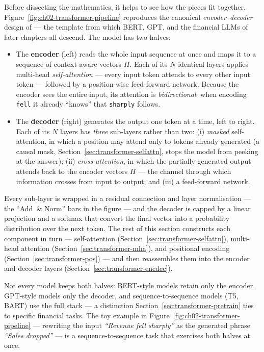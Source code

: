 \begin{deepdive}
Before dissecting the mathematics, it helps to see how the pieces fit together.
Figure~\ref{fig:ch02-transformer-pipeline} reproduces the canonical
\emph{encoder--decoder} design of \citet{vaswani2017attention} --- the template
from which BERT, GPT, and the financial LLMs of later chapters all descend.
The model has two halves:
\begin{itemize}
  \item The \textbf{encoder} (left) reads the whole input sequence at once and
        maps it to a sequence of context-aware vectors $H$.  Each of its $N$
        identical layers applies multi-head \emph{self-attention} --- every
        input token attends to every other input token --- followed by a
        position-wise feed-forward network.  Because the encoder sees the entire
        input, its attention is \emph{bidirectional}: when encoding
        \texttt{fell} it already ``knows'' that \texttt{sharply} follows.
  \item The \textbf{decoder} (right) generates the output one token at a time,
        left to right.  Each of its $N$ layers has \emph{three} sub-layers
        rather than two: (i) \emph{masked} self-attention, in which a position
        may attend only to tokens already generated (a causal mask,
        Section~\ref{sec:transformer-selfattn}, stops the model from peeking at
        the answer); (ii) \emph{cross-attention}, in which the partially
        generated output attends back to the encoder vectors $H$ --- the channel
        through which information crosses from input to output; and (iii) a
        feed-forward network.
\end{itemize}
Every sub-layer is wrapped in a residual connection and layer normalisation
--- the ``Add~\& Norm'' bars in the figure --- and the decoder is capped by a
linear projection and a softmax that convert the final vector into a probability
distribution over the next token.
The rest of this section constructs each component in turn --- self-attention
(Section~\ref{sec:transformer-selfattn}), multi-head attention
(Section~\ref{sec:transformer-mha}), and positional encoding
(Section~\ref{sec:transformer-pos}) --- and then reassembles them into the
encoder and decoder layers (Section~\ref{sec:transformer-encdec}).

Not every model keeps both halves: BERT-style models retain only the encoder,
GPT-style models only the decoder, and sequence-to-sequence models (T5, BART)
use the full stack --- a distinction Section~\ref{sec:transformer-pretrain} ties
to specific financial tasks.
The toy example in Figure~\ref{fig:ch02-transformer-pipeline} --- rewriting the
input \textit{``Revenue fell sharply''} as the generated phrase
\textit{``Sales dropped''} --- is a sequence-to-sequence task that exercises both
halves at once.

\end{deepdive}

